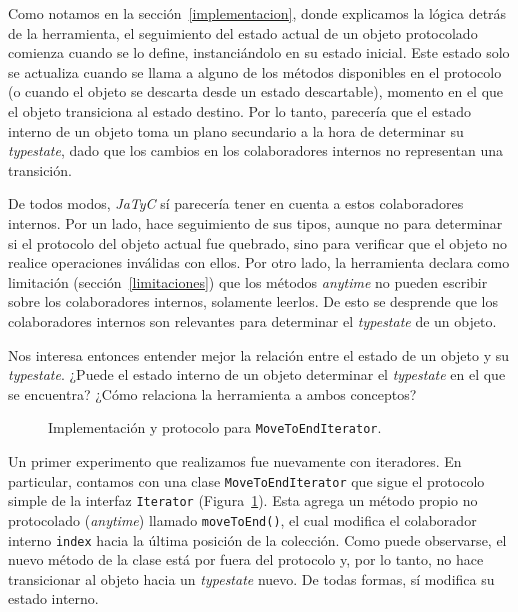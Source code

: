 Como notamos en la sección~\ref{implementacion}, donde explicamos la lógica detrás de la herramienta, el seguimiento del estado actual de un objeto protocolado comienza cuando se lo define, instanciándolo en su estado inicial. Este estado solo se actualiza cuando se llama a alguno de los métodos disponibles en el protocolo (o cuando el objeto se descarta desde un estado descartable), momento en el que el objeto transiciona al estado destino. Por lo tanto, parecería que el estado interno de un objeto toma un plano secundario a la hora de determinar su \textit{typestate}, dado que los cambios en los colaboradores internos no representan una transición.

De todos modos, \textit{JaTyC} sí parecería tener en cuenta a estos colaboradores internos. Por un lado, hace seguimiento de sus tipos, aunque no para determinar si el protocolo del objeto actual fue quebrado, sino para verificar que el objeto no realice operaciones inválidas con ellos. Por otro lado, la herramienta declara como limitación (sección~\ref{limitaciones}) que los métodos \textit{anytime} no pueden escribir sobre los colaboradores internos, solamente leerlos. De esto se desprende que los colaboradores internos son relevantes para determinar el \textit{typestate} de un objeto.

Nos interesa entonces entender mejor la relación entre el estado de un objeto y su \textit{typestate}. ¿Puede el estado interno de un objeto determinar el \textit{typestate} en el que se encuentra? ¿Cómo relaciona la herramienta a ambos conceptos?

\begin{figure}[htbp]
    \centering
    
    \vspace{0.3cm}
    
    \caption{Implementación y protocolo para \texttt{MoveToEndIterator}.}
    \label{exp:state-equals-typestate:iterator}
\end{figure}

Un primer experimento que realizamos fue nuevamente con iteradores. En particular, contamos con una clase \texttt{MoveToEndIterator} que sigue el protocolo simple de la interfaz \texttt{Iterator} (Figura~\ref{exp:state-equals-typestate:iterator}). Esta agrega un método propio no protocolado (\textit{anytime}) llamado \texttt{moveToEnd()}, el cual modifica el colaborador interno \texttt{index} hacia la última posición de la colección. Como puede observarse, el nuevo método de la clase está por fuera del protocolo y, por lo tanto, no hace transicionar al objeto hacia un \textit{typestate} nuevo. De todas formas, sí modifica su estado interno.

